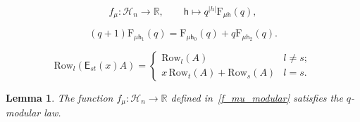 \documentclass[10pt,a4paper]{amsart}
\newtheorem{lemma}{Lemma}
\newcommand{\EE}{\mathsf{E}}
\newcommand{\F}{\mathrm{F}}
\newcommand{\RR}{{\mathbb{R}}}
\newcommand{\hes}{\mathsf{h}}
\begin{document}
\begin{equation}\label{f_mu_modular}
    f_\mu: \mathcal{H}_n\to \RR,\qquad \hes\mapsto q^{|h|}\F_{\mu\hes}(q),
\end{equation}

\begin{equation}\label{F_mu_modular}
    (q+1)\F_{\mu\hes_1}(q)=\F_{\mu\hes_0}(q)+q\F_{\mu\hes_2}(q).
\end{equation}

\begin{equation}
\label{elementary_oper}
\mathrm{Row}_l(\EE_{st}(x)A) = \begin{cases} \mathrm{Row}_l(A) & l \neq s; \\ x \,\mathrm{Row}_t(A) + \mathrm{Row}_s(A) & l = s. \end{cases}
\end{equation}

\begin{lemma}
\label{lem:modularl}
 The function $f_\mu: \mathcal{H}_n\to \mathbb{R}$ defined in~\cref{f_mu_modular} satisfies the $q$-modular law. 
\end{lemma}
\end{document}
